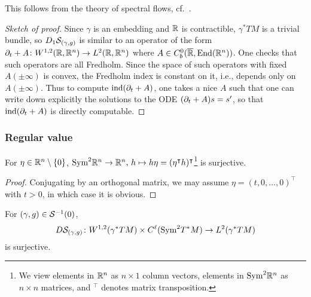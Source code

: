 This follows from the theory of spectral flows, cf.\ \cite[Section 2.2]{Sch}.

\begin{proof}[Sketch of proof]
	Since $\gamma$ is an embedding and ${\mathbb{R}}$ is contractible, 
	$\gamma^*TM$ is a trivial bundle, so $D_1{\mathcal{S}}_{(\gamma,g)}$ 
	is similar to an operator of the form 
	$\partial_t + A \colon W^{1, 2} ({\mathbb{R}}, {\mathbb{R}}^n) \to L^2 ({\mathbb{R}}, {\mathbb{R}}^n)$ 
	where $A \in C^0_b (\overline{{\mathbb{R}}}, \operatorname{End}({\mathbb{R}}^n))$. 
	One checks that such operators are all Fredholm. 
	Since the space of such operators with fixed $A(\pm\infty)$ 
	is convex, the Fredholm index is constant on it, 
	i.e., depends only on $A(\pm\infty)$. 
	Thus to compute $\operatorname{ind}(\partial_t + A)$, one takes a nice $A$ 
	such that one can write down explicitly the solutions 
	to the ODE $(\partial_t + A) s = s'$, so that $\operatorname{ind}(\partial_t + A)$ 
	is directly computable.
\end{proof}

\subsubsection{Regular value}

\begin{lemma}
	For $\eta \in {\mathbb{R}}^n \setminus \{0\}$, 
	$\mathrm{Sym}^2 {\mathbb{R}}^n \to {\mathbb{R}}^n,\, h \mapsto h \eta = 
	(\eta^\intercal h)^\intercal$\footnote{We view elements in ${\mathbb{R}}^n$ 
	as $n \times 1$ column vectors,
	elements in $\mathrm{Sym}^2 {\mathbb{R}}^n$ as $n \times n$ matrices, and 
	$^\intercal$ denotes matrix transposition.} 
	is surjective.
\end{lemma}
\begin{proof}
	Conjugating by an orthogonal matrix, we may assume 
	$\eta = (t, 0, \ldots, 0)^\intercal$ with $t>0$, 
	in which case it is obvious.
\end{proof}

\begin{proposition}
	For $(\gamma, g) \in {\mathcal{S}}^{-1} (0)$,
	\[
		D{\mathcal{S}}_{(\gamma, g)} \colon W^{1, 2} (\gamma^*TM) 
			\times C^\ell (\mathrm{Sym}^2 T^*M) \to L^2(\gamma^*TM)
	\] 
	is surjective.
\end{proposition}

